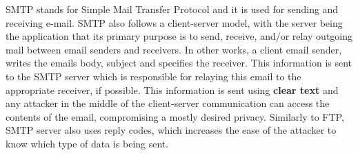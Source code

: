 SMTP stands for Simple Mail Transfer Protocol and it is used for sending and receiving e-mail. 
SMTP also follows a client-server model, with the server being the application that its primary purpose is to send, receive, and/or relay outgoing mail between email senders and receivers. 
In other works, a client email sender, writes the emails body, subject and specifies the receiver. 
This information is sent to the SMTP server which is responsible for relaying this email to the appropriate receiver, if possible. 
This information is sent using \textbf{clear text} and any attacker in the middle of the client-server communication can access the contents of the email, compromising a mostly desired privacy. 
Similarly to FTP, SMTP server also uses reply codes, which increases the ease of the attacker to know which type of data is being sent.

